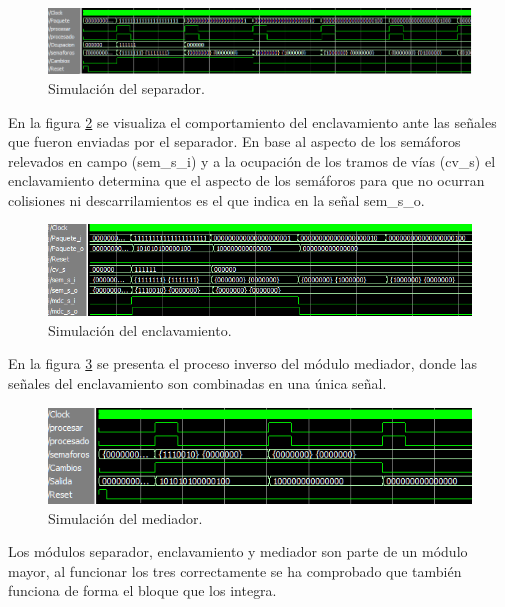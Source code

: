 		\begin{figure}[!hbt]
		\centering
		\includegraphics[scale=0.55]{./Figures/Test/Separador}
			\caption{Simulación del separador.}
			\label{fig:Test_Separador}
		\end{figure}
		
		En la figura \ref{fig:Test_Enclavamiento} se visualiza el comportamiento del enclavamiento ante las señales que fueron enviadas por el separador. En base al aspecto de los semáforos relevados en campo (sem\_s\_i) y a la ocupación de los tramos de vías (cv\_s) el enclavamiento determina que el aspecto de los semáforos para que no ocurran colisiones ni descarrilamientos es el que indica en la señal sem\_s\_o.
		
		\begin{figure}[!hbt]
		\centering
		\includegraphics[scale=0.7]{./Figures/Test/Enclavamiento}
			\caption{Simulación del enclavamiento.}
			\label{fig:Test_Enclavamiento}
		\end{figure}

		\vspace{5cm}
		
		En la figura \ref{fig:Test_Mediador} se presenta el proceso inverso del módulo mediador, donde las señales del enclavamiento son combinadas en una única señal.
		
		\begin{figure}[!hbt]
		\centering
		\includegraphics[scale=0.9]{./Figures/Test/Mediador}
			\caption{Simulación del mediador.}
			\label{fig:Test_Mediador}
		\end{figure}
		
		Los módulos separador, enclavamiento y mediador son parte de un módulo mayor, al funcionar los tres correctamente se ha comprobado que también funciona de forma el bloque que los integra.
		
